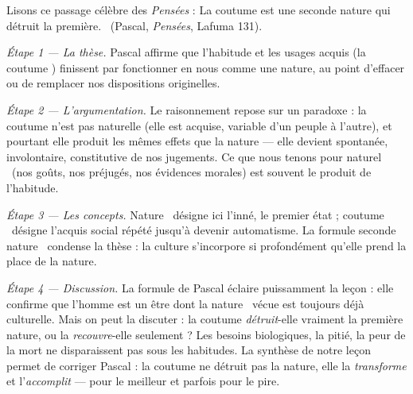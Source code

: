 \documentclass[11pt]{article}
\begin{document}
\begin{experience}
Lisons ce passage célèbre des \emph{Pensées} : \guillemotleft La coutume est une seconde nature qui détruit la première. \guillemotright\ (Pascal, \emph{Pensées}, Lafuma 131).

\emph{Étape 1 — La thèse.} Pascal affirme que l'habitude et les usages acquis (\guillemotleft la coutume \guillemotright) finissent par fonctionner en nous comme une nature, au point d'effacer ou de remplacer nos dispositions originelles.

\emph{Étape 2 — L'argumentation.} Le raisonnement repose sur un paradoxe : la coutume n'est pas naturelle (elle est acquise, variable d'un peuple à l'autre), et pourtant elle produit les mêmes effets que la nature — elle devient spontanée, involontaire, constitutive de nos jugements. Ce que nous tenons pour \guillemotleft naturel \guillemotright\ (nos goûts, nos préjugés, nos évidences morales) est souvent le produit de l'habitude.

\emph{Étape 3 — Les concepts.} \guillemotleft Nature \guillemotright\ désigne ici l'inné, le premier état ; \guillemotleft coutume \guillemotright\ désigne l'acquis social répété jusqu'à devenir automatisme. La formule \guillemotleft seconde nature \guillemotright\ condense la thèse : la culture s'incorpore si profondément qu'elle prend la place de la nature.

\emph{Étape 4 — Discussion.} La formule de Pascal éclaire puissamment la leçon : elle confirme que l'homme est un être dont la \guillemotleft nature \guillemotright\ vécue est toujours déjà culturelle. Mais on peut la discuter : la coutume \emph{détruit}-elle vraiment la première nature, ou la \emph{recouvre}-elle seulement ? Les besoins biologiques, la pitié, la peur de la mort ne disparaissent pas sous les habitudes. La synthèse de notre leçon permet de corriger Pascal : la coutume ne détruit pas la nature, elle la \emph{transforme} et l'\emph{accomplit} — pour le meilleur et parfois pour le pire.
\end{experience}
\end{document}
